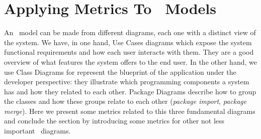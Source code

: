 \section{Applying Metrics To \uml\ Models}\label{metrics}

An \uml\ model can be made from different diagrams, each one with a distinct view of the system.
We have, in one hand, Use Cases diagrams which expose the system functional requirements and how each user interacts with them. They are a good overview of what features the system offers to the end user.
In the other hand, we use Class Diagrams for represent the blueprint of the application under the developer perspective: they illustrate which programming components a system has and how they related to each other.
Package Diagrams describe how to group the classes and how these groups relate to each other (\emph{package import}, \emph{package merge}).
Here we present some metrics related to this three fundamental diagrams and conclude the section by introducing some metrics for other not less important \uml\ diagrams.

